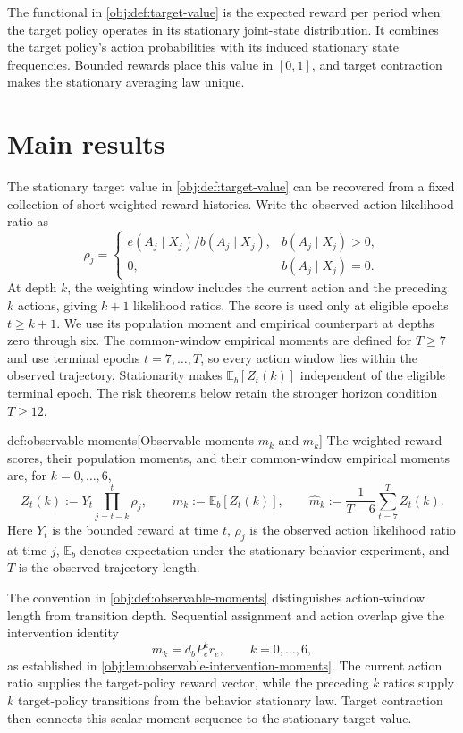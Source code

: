 \documentclass[11pt]{article}
\begin{document}
The functional in \cref{obj:def:target-value} is the expected reward per period when the target policy operates in its stationary joint-state distribution. It combines the target policy's action probabilities with its induced stationary state frequencies. Bounded rewards place this value in \([0,1]\), and target contraction makes the stationary averaging law unique.


\section{Main results}

The stationary target value in \cref{obj:def:target-value} can be recovered from a fixed collection of short weighted reward histories. Write the observed action likelihood ratio  as
\[
\rho_j=
\begin{cases}
e(A_j\mid X_j)/b(A_j\mid X_j),&b(A_j\mid X_j)>0,\\
0,&b(A_j\mid X_j)=0.
\end{cases}
\]
At depth \(k\), the weighting window includes the current action and the preceding \(k\) actions, giving \(k+1\) likelihood ratios. The score  is used only at eligible epochs \(t\geq k+1\). We use its population moment  and empirical counterpart  at depths zero through six. The common-window empirical moments are defined for \(T\geq7\) and use terminal epochs \(t=7,\ldots,T\), so every action window lies within the observed trajectory. Stationarity makes \(\mathbb E_b[Z_t(k)]\) independent of the eligible terminal epoch. The risk theorems below retain the stronger horizon condition \(T\geq12\).

\begin{definitionv}{def:observable-moments}[Observable moments $m_k$ and $\widehat m_k$]
The weighted reward scores, their population moments, and their common-window empirical moments are, for \(k=0,\ldots,6\),
\[
Z_t(k)
:=
Y_t\prod_{j=t-k}^{t}\rho_j,
\qquad
m_k
:=
\mathbb E_b[Z_t(k)],
\qquad
\widehat m_k
:=
\frac{1}{T-6}
\sum_{t=7}^{T}Z_t(k).
\]
Here \(Y_t\) is the bounded reward at time \(t\), \(\rho_j\) is the observed action likelihood ratio at time \(j\), \(\mathbb E_b\) denotes expectation under the stationary behavior experiment, and \(T\) is the observed trajectory length.
\end{definitionv}

The convention in \cref{obj:def:observable-moments} distinguishes action-window length from transition depth. Sequential assignment and action overlap give the intervention identity
\[
m_k=d_bP_e^k r_e,\qquad k=0,\ldots,6,
\]
as established in \cref{obj:lem:observable-intervention-moments}. The current action ratio supplies the target-policy reward vector, while the preceding \(k\) ratios supply \(k\) target-policy transitions from the behavior stationary law. Target contraction then connects this scalar moment sequence to the stationary target value.
\end{document}
